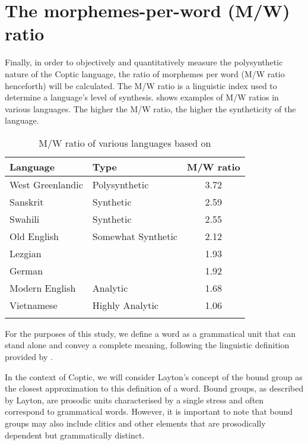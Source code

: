 \documentclass[output=paper,colorlinks,citecolor=brown ,chinesefont]{langscibook}
\begin{document}
\section{The morphemes-per-word (M/W) ratio}
   Finally, in order to objectively and quantitatively measure the polysynthetic nature of the Coptic language, the ratio of morphemes per word (M/W ratio henceforth) will be calculated. The M/W ratio is a linguistic index used to determine a language's level of synthesis.  shows examples of M/W ratios in various languages. The higher the M/W ratio, the higher the syntheticity of the language.

\begin{table}
    \centering
    \begin{tabular}{llc} \lsptoprule
    Language & Type & M/W ratio \\ \midrule
    West Greenlandic & Polysynthetic &	3.72 \\
    Sanskrit & Synthetic &	2.59 \\
    Swahili & Synthetic & 2.55 \\
    Old English  & Somewhat Synthetic &	2.12 \\
    Lezgian &	& 1.93 \\
    German & &	1.92 \\
    Modern English & Analytic &	1.68 \\
    Vietnamese  & Highly Analytic &	1.06 \\ \lspbottomrule
    \end{tabular}
    \caption{M/W ratio of various languages based on \citet[6]{haspelmathsims} }
    \label{tab:mw}
\end{table}

For the purposes of this study, we define a word as a grammatical unit that can stand alone and convey a complete meaning, following the linguistic definition provided by \citet{aronofffudeman}.

In the context of Coptic, we will consider Layton's concept of the bound group as the closest approximation to this definition of a word. Bound groups, as described by Layton, are prosodic units characterised by a single stress and often correspond to grammatical words. However, it is important to note that bound groups may also include clitics and other elements that are prosodically dependent but grammatically distinct.
\end{document}
